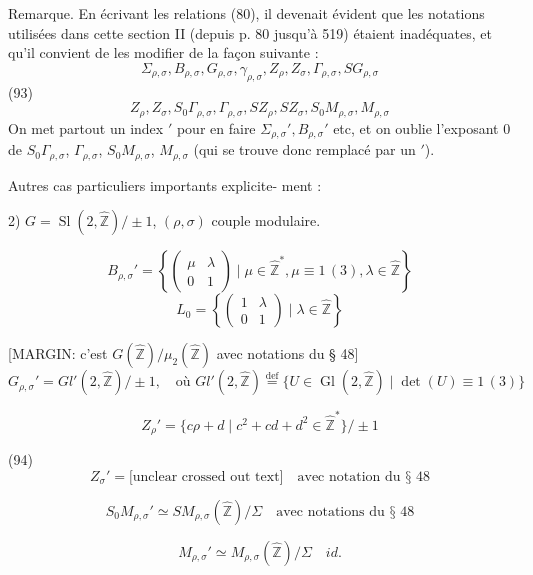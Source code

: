 \begin{enumerate}
[MARGIN: Ce n'est pas si simple ! par ex. pour $G = \operatorname{Sl}(2,\hat{\mathbb{Z}})$ $\rho=3$, $\sigma=2$ (ou plus exactement leurs images dans $G/\{\pm 1\}$) on verrait qu'on ne peut se servir des anciennes notations.]
Remarque. En écrivant les relations (80), il devenait évident que les notations utilisées dans cette section II (depuis p. 80 jusqu'à 519) étaient inadéquates, et qu'il convient de les modifier de la façon suivante :
$$ \Sigma_{\rho,\sigma}, B_{\rho,\sigma}, G_{\rho,\sigma}, \gamma_{\rho,\sigma}, Z_{\rho}, Z_{\sigma}, \Gamma_{\rho,\sigma}, S G_{\rho,\sigma} $$
(93) $$ Z_{\rho}, Z_{\sigma}, S_0\Gamma_{\rho,\sigma}, \Gamma_{\rho,\sigma}, S Z_{\rho}, S Z_{\sigma}, S_0 M_{\rho,\sigma}, M_{\rho,\sigma} $$
On met partout un index $'$ pour en faire $\Sigma_{\rho,\sigma}', B_{\rho,\sigma}'$ etc, et on oublie l'exposant $0$ de $S_0\Gamma_{\rho,\sigma}$, $\Gamma_{\rho,\sigma}$, $S_0 M_{\rho,\sigma}$, $M_{\rho,\sigma}$ (qui se trouve donc remplacé par un $'$).

Autres cas particuliers importants explicite-
ment :

2) $G = \operatorname{Sl}(2,\hat{\mathbb{Z}})/\pm 1$, $(\rho, \sigma)$ couple modulaire.

$$ B_{\rho,\sigma}' = \left\{ \begin{pmatrix} \mu & \lambda \\ 0 & 1 \end{pmatrix} \mid \mu \in \hat{\mathbb{Z}}^*, \mu \equiv 1 \, (3), \lambda \in \hat{\mathbb{Z}} \right\} $$
$$ L_0 = \left\{ \begin{pmatrix} 1 & \lambda \\ 0 & 1 \end{pmatrix} \mid \lambda \in \hat{\mathbb{Z}} \right\} $$

[MARGIN: c'est $G(\hat{\mathbb{Z}})/ \mu_2(\hat{\mathbb{Z}})$ avec notations du § 48]
$$ G_{\rho,\sigma}' = Gl'(2, \hat{\mathbb{Z}})/ \pm 1, \quad \text{où } Gl'(2,\hat{\mathbb{Z}}) \overset{\text{def}}{=} \{ U \in \operatorname{Gl}(2,\hat{\mathbb{Z}}) \mid \det(U) \equiv 1 \, (3) \} $$

$$ Z_{\rho}' = \{ c\rho+d \mid c^2+cd+d^2 \in \hat{\mathbb{Z}}^* \} / \pm 1 $$

(94) $$ Z_{\sigma}' = \text{[unclear crossed out text]} \quad \text{avec notation du § 48} $$

$$ S_0 M_{\rho,\sigma}' \simeq S M_{\rho,\sigma}(\hat{\mathbb{Z}})/\Sigma \quad \text{avec notations du § 48} $$

$$ M_{\rho,\sigma}' \simeq M_{\rho,\sigma}(\hat{\mathbb{Z}})/\Sigma \quad id. $$


\end{enumerate}
